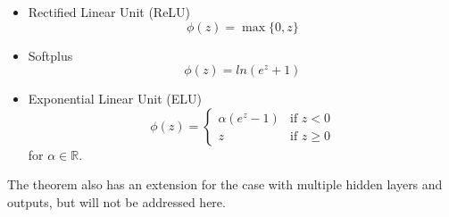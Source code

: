 \begin{itemize}
    \item Rectified Linear Unit (ReLU)
    \[
        \phi(z) = \max\{0, z\}    
    \]
    \item Softplus
    \[
        \phi(z) = ln(e^z+1)
    \]
    \item Exponential Linear Unit (ELU)
    \begin{equation*}
        \phi(z)=
            \begin{cases}
                \alpha(e^z-1) & \text{if } z < 0 \\
                z & \text{if } z \geq 0
            \end{cases}
    \end{equation*}
    for $\alpha \in \mathbb{R}$.
\end{itemize}
The theorem also has an extension for the case with multiple hidden layers and outputs, but will not be addressed here.